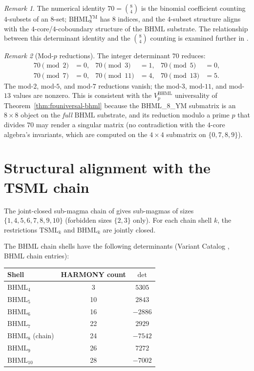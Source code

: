 \documentclass[11pt,reqno]{amsart}
\theoremstyle{plain}
\theoremstyle{definition}
\theoremstyle{remark}
\newtheorem*{remark}{Remark}
\newcommand{\TSML}{\mathrm{TSML}}
\newcommand{\BHML}{\mathrm{BHML}}
\begin{document}
\begin{remark}
The numerical identity $70 = \binom{8}{4}$ is the binomial coefficient
counting $4$-subsets of an $8$-set; $\BHML_8^{\text{YM}}$ has $8$
indices, and the $4$-subset structure aligns with the
$4$-core/$4$-coboundary structure of the $\BHML$ substrate. The
relationship between this determinant identity and the $\binom{8}{4}$
counting is examined further in \cite{SandersGishFourCore}.
\end{remark}

\begin{remark}[Mod-$p$ reductions]
The integer determinant $70$ reduces:
\begin{align*}
70 \pmod{2} &= 0, & 70 \pmod{3} &= 1, & 70 \pmod{5} &= 0, \\
70 \pmod{7} &= 0, & 70 \pmod{11} &= 4, & 70 \pmod{13} &= 5.
\end{align*}
The mod-$2$, mod-$5$, and mod-$7$ reductions vanish; the mod-$3$,
mod-$11$, and mod-$13$ values are nonzero. This is consistent with
the $V_p^\BHML$ universality of Theorem~\ref{thm:fpuniversal-bhml}
because the BHML\_8\_YM submatrix is an $8 \times 8$ object on the
\emph{full} $\BHML$ substrate, and its reduction modulo a prime $p$
that divides $70$ may render a singular matrix (no contradiction with
the $4$-core algebra's invariants, which are computed on the
$4 \times 4$ submatrix on $\{0, 7, 8, 9\}$).
\end{remark}

\section{Structural alignment with the TSML chain}
\label{sec:chain}

The joint-closed sub-magma chain of \cite{SandersGishFourCore}
gives sub-magmas of sizes $\{1, 4, 5, 6, 7, 8, 9, 10\}$ (forbidden
sizes $\{2, 3\}$ only). For each chain shell $k$, the restrictions
$\TSML_k$ and $\BHML_k$ are jointly closed.

The BHML chain shells have the following determinants
(Variant Catalog \cite{LensCatalog}, BHML chain entries):
\begin{center}
\begin{tabular}{l c c}
\toprule
Shell & HARMONY count & $\det$ \\
\midrule
$\BHML_4$ & 3 & $5305$ \\
$\BHML_5$ & 10 & $2843$ \\
$\BHML_6$ & 16 & $-2886$ \\
$\BHML_7$ & 22 & $2929$ \\
$\BHML_8$ (chain) & 24 & $-7542$ \\
$\BHML_9$ & 26 & $7272$ \\
$\BHML_{10}$ & 28 & $-7002$ \\
\bottomrule
\end{tabular}
\end{center}
\end{document}
